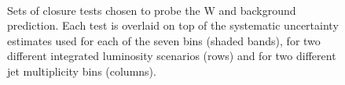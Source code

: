\begin{figure}[h!]
\begin{center}
     \\
    \caption{Sets of closure tests chosen to probe the W and \ttbar
      background prediction. Each test is overlaid on top of
      the systematic uncertainty estimates used for each of the seven
      \scalht bins (shaded bands), for two different integrated
      luminosity scenarios (rows) and for two different jet
      multiplicity bins (columns).}
    \label{fig:ttWClosure}
  \end{center} 
\end{figure}

